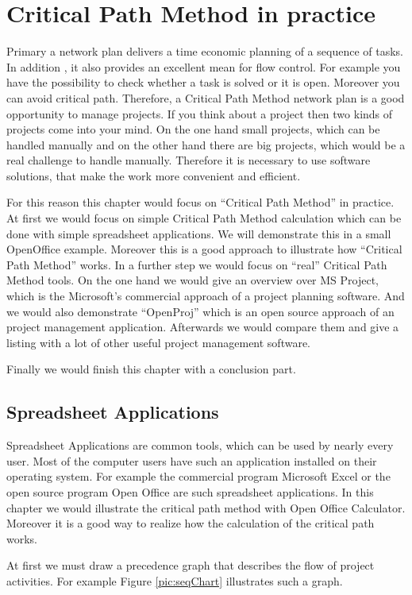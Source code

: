 \section{Critical Path Method in practice}
Primary a network plan delivers a time economic planning of a sequence of tasks. In addition , it also provides an excellent mean for flow control. For example you have the possibility to check whether a task is solved or it is open. Moreover you can avoid critical path. Therefore, a Critical Path Method network plan is a good opportunity to manage projects. If you think about a project then two kinds of projects come into your mind. On the one hand small projects, which can be handled manually and on the other hand there are big projects, which would be a real challenge to handle manually. Therefore it is necessary to use software solutions, that make the work more convenient and efficient. 

For this reason this chapter would focus on “Critical Path Method” in practice. At first we would focus on simple Critical Path Method calculation which can be done with simple spreadsheet applications. We will demonstrate this in a small OpenOffice example. Moreover this is a good approach to illustrate how “Critical Path Method” works.
In a further step we would focus on “real” Critical Path Method tools. On the one hand we would give an overview over MS Project, which is the Microsoft's commercial approach of a project planning software. And we would also demonstrate “OpenProj” which is an open source approach of an project management application. Afterwards we would compare them and give a listing with a lot of other useful project management software.

Finally we would finish this chapter with a conclusion part.

\subsection{Spreadsheet Applications}
Spreadsheet Applications are common tools, which can be used by nearly every user. Most of the computer users have such an application installed on their operating system. For example the commercial program Microsoft Excel or the open source program Open Office are such spreadsheet applications. In this chapter we would illustrate the critical path method with Open Office Calculator. Moreover it is a good way to realize how the calculation of the critical path works.

At first we must draw a precedence graph that describes the flow of project activities. For example Figure \ref{pic:seqChart}  illustrates such a graph. 

